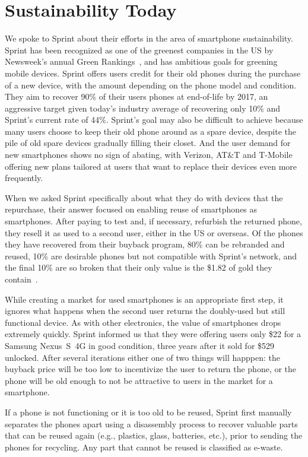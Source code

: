 \section{Sustainability Today}
\label{sec-sustainability}

We spoke to Sprint about their efforts in the area of smartphone
sustainability. Sprint has been recognized as one of the greenest companies
in the US by Newsweek's annual Green Rankings~\cite{sprintgreen-url}, and has
ambitious goals for greening mobile devices. Sprint offers users credit for
their old phones during the purchase of a new device, with the amount
depending on the phone model and condition. They aim to recover 90\% of their
users phones at end-of-life by 2017, an aggressive target given today's
industry average of recovering only 10\% and Sprint's current rate of 44\%.
Sprint's goal may also be difficult to achieve because many users choose to
keep their old phone around as a spare device, despite the pile of old spare
devices gradually filling their closet. And the user demand for new
smartphones shows no sign of abating, with Verizon, AT\&T and T-Mobile
offering new plans tailored at users that want to replace their devices even
more frequently.

When we asked Sprint specifically about what they do with devices that the
repurchase, their answer focused on enabling reuse of smartphones as
smartphones. After paying to test and, if necessary, refurbish the returned
phone, they resell it as used to a second user, either in the US or overseas.
Of the phones they have recovered from their buyback program, 80\% can be
rebranded and reused, 10\% are desirable phones but not compatible with
Sprint's network, and the final 10\% are so broken that their only value is
the \$1.82 of gold they contain~\cite{cnn-goldinphone}.

While creating a market for used smartphones is an appropriate first step, it
ignores what happens when the second user returns the doubly-used but still
functional device. As with other electronics, the value of smartphones drops
extremely quickly. Sprint informed us that they were offering users only \$22
for a Samsung Nexus~S~4G in good condition, three years after it sold for
\$529 unlocked. After several iterations either one of two things will
happpen: the buyback price will be too low to incentivize the user to return
the phone, or the phone will be old enough to not be attractive to users in
the market for a smartphone.

If a phone is not functioning or it is too old to be reused, Sprint first manually separates the phones apart using a disassembly process to recover valuable parts that can be reused again (e.g.,  plastics, glass, batteries, etc.), prior to sending the phones for recycling. Any part that cannot be reused is classified as e-waste.

